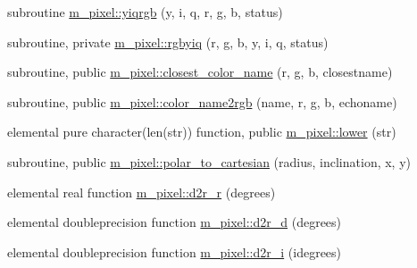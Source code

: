 \begin{DoxyCompactItemize}
\item 
subroutine \mbox{\hyperlink{namespacem__pixel_a0f4f12a4a769b8827a79b44f333eca28}{m\+\_\+pixel\+::yiqrgb}} (y, i, q, r, g, b, status)
\item 
subroutine, private \mbox{\hyperlink{namespacem__pixel_a0c025b24458dba5fb448f62cb10c7088}{m\+\_\+pixel\+::rgbyiq}} (r, g, b, y, i, q, status)
\item 
subroutine, public \mbox{\hyperlink{namespacem__pixel_a8555eecec7e18106e8167e137cfe8424}{m\+\_\+pixel\+::closest\+\_\+color\+\_\+name}} (r, g, b, closestname)
\item 
subroutine, public \mbox{\hyperlink{namespacem__pixel_aee26ac45961d4093d2e472fcb6e1887d}{m\+\_\+pixel\+::color\+\_\+name2rgb}} (name, r, g, b, echoname)
\item 
elemental pure character(len(str)) function, public \mbox{\hyperlink{namespacem__pixel_a7b4934756a8325a19fee6653c4cbf6af}{m\+\_\+pixel\+::lower}} (str)
\item 
subroutine, public \mbox{\hyperlink{namespacem__pixel_a5ee5c618d117b150b661e15517a3d408}{m\+\_\+pixel\+::polar\+\_\+to\+\_\+cartesian}} (radius, inclination, x, y)
\item 
elemental real function \mbox{\hyperlink{namespacem__pixel_af1963e62c5cc06bfb042831d1c869dc1}{m\+\_\+pixel\+::d2r\+\_\+r}} (degrees)
\item 
elemental doubleprecision function \mbox{\hyperlink{namespacem__pixel_a2ea42e55432274dec04fdc822e484cdb}{m\+\_\+pixel\+::d2r\+\_\+d}} (degrees)
\item 
elemental doubleprecision function \mbox{\hyperlink{namespacem__pixel_a0ac7088105ca5334d0ca3f1e4ea16d65}{m\+\_\+pixel\+::d2r\+\_\+i}} (idegrees)
\end{DoxyCompactItemize}

